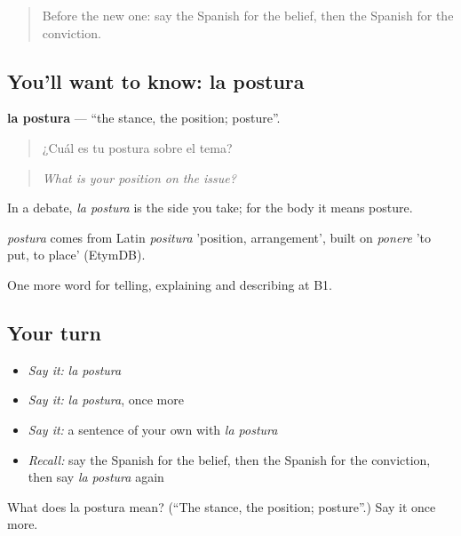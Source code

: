 \label{lesson:ES-C576-postura}



\begin{quote}
Before the new one: say the Spanish for the belief, then the Spanish for the conviction.
\end{quote}

\subsection*{You'll want to know: la postura}
\textbf{la postura} — \textquotedblleft{}the stance, the position; posture\textquotedblright{}.

\begin{quote}
¿Cuál es tu postura sobre el tema?
\end{quote}

\begin{quote}
\emph{What is your position on the issue?}
\end{quote}

In a debate, \emph{la postura} is the side you take; for the body it means posture.

\begin{cousinweb}
\emph{postura} comes from Latin \emph{positura} 'position, arrangement', built on \emph{ponere} 'to put, to place' (EtymDB).
\end{cousinweb}

\begin{grammarlens}[title={What you've built}]
One more word for telling, explaining and describing at B1.
\end{grammarlens}

\subsection*{Your turn}
\begin{itemize}
\raggedright
  \item \emph{Say it:} \emph{la postura}
  \item \emph{Say it:} \emph{la postura}, once more
  \item \emph{Say it:} a sentence of your own with \emph{la postura}
  \item \emph{Recall:} say the Spanish for the belief, then the Spanish for the conviction, then say \emph{la postura} again
\end{itemize}

\begin{tcolorbox}[breakable,colback=teal!4,colframe=teal!35!black,title={Before you move on}]
What does la postura mean? (\textquotedblleft{}The stance, the position; posture\textquotedblright{}.) Say it once more.
\end{tcolorbox}
